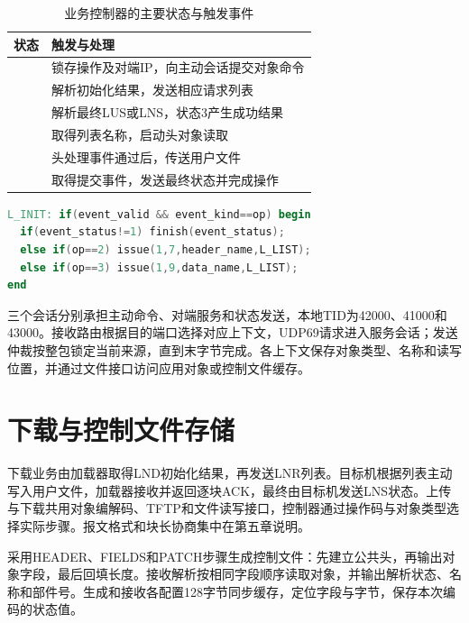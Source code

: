 \begin{table}[htbp]\centering\small
\caption{业务控制器的主要状态与触发事件}
\begin{tabularx}{\linewidth}{@{}l Y@{}}\toprule 状态 & 触发与处理\\\midrule
{} & 锁存操作及对端IP，向主动会话提交对象命令\\
 & 解析初始化结果，发送相应请求列表\\
 & 解析最终LUS或LNS，状态3产生成功结果\\
 & 取得列表名称，启动头对象读取\\
 & 头处理事件通过后，传送用户文件\\
 & 取得提交事件，发送最终状态并完成操作\\\bottomrule
\end{tabularx}\end{table}

\par\noindent\begin{minipage}{\linewidth}
\begin{lstlisting}[language=Verilog,caption={初始化完成后发出上传请求列表}]
L_INIT: if(event_valid && event_kind==op) begin
  if(event_status!=1) finish(event_status);
  else if(op==2) issue(1,7,header_name,L_LIST);
  else if(op==3) issue(1,9,data_name,L_LIST);
end
\end{lstlisting}
\end{minipage}\par

三个会话分别承担主动命令、对端服务和状态发送，本地TID为42000、41000和43000。接收路由根据目的端口选择对应上下文，UDP69请求进入服务会话；发送仲裁按整包锁定当前来源，直到末字节完成。各上下文保存对象类型、名称和读写位置，并通过文件接口访问应用对象或控制文件缓存。

\section{下载与控制文件存储}
下载业务由加载器取得LND初始化结果，再发送LNR列表。目标机根据列表主动写入用户文件，加载器接收并返回逐块ACK，最终由目标机发送LNS状态。上传与下载共用对象编解码、TFTP和文件读写接口，控制器通过操作码与对象类型选择实际步骤。报文格式和块长协商集中在第五章说明。

采用HEADER、FIELDS和PATCH步骤生成控制文件：先建立公共头，再输出对象字段，最后回填长度。接收解析按相同字段顺序读取对象，并输出解析状态、名称和部件号。生成和接收各配置128字节同步缓存，定位字段与字节，保存本次编码的状态值。


